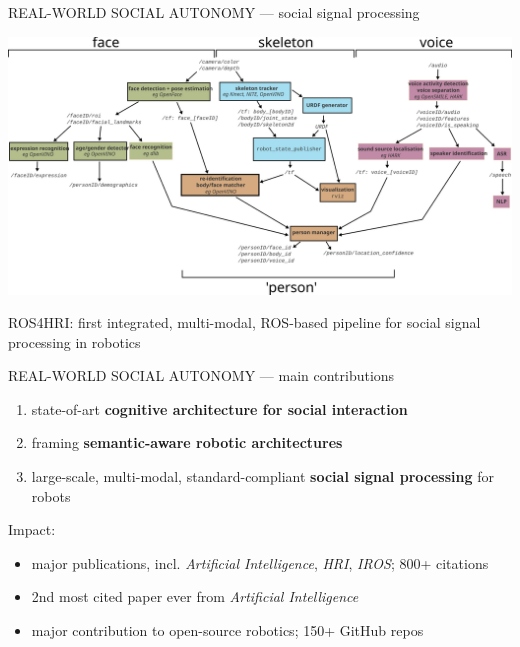 \documentclass[xcolor=table]{beamer}
\begin{document}
{

\begin{frame}{REAL-WORLD SOCIAL AUTONOMY --- social signal processing}
    \begin{center}
        \includegraphics[width=\columnwidth]{architectures/ros4hri-pipeline}
    \end{center}
    ROS4HRI: first integrated, multi-modal, ROS-based pipeline for social signal
    processing in robotics
\end{frame}
}

\begin{frame}{REAL-WORLD SOCIAL AUTONOMY --- main contributions}

    \begin{enumerate}
        \item state-of-art \textbf{cognitive architecture for social interaction}
        \item framing \textbf{semantic-aware robotic architectures}
        \item large-scale, multi-modal, standard-compliant \textbf{social signal
            processing} for robots
    \end{enumerate}

Impact:
    \begin{itemize}
        \item major publications, incl. \emph{Artificial Intelligence},
            \emph{HRI}, \emph{IROS}; 800+ citations
        \item 2nd most cited paper ever from \emph{Artificial Intelligence}
        \item major contribution to open-source robotics; 150+ GitHub repos
    \end{itemize}
\end{frame}
\end{document}
